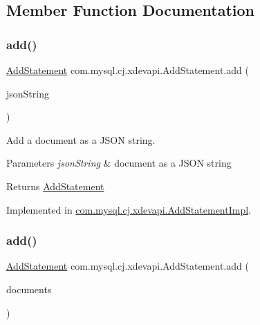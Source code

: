 \subsection{Member Function Documentation}
\mbox{\label{interfacecom_1_1mysql_1_1cj_1_1xdevapi_1_1_add_statement_a74f363f3bc32c51f83c4ae69722b179c}} 
\subsubsection{\texorpdfstring{add()}{add()}\hspace{0.1cm}{\footnotesize\ttfamily [1/2]}}
{\footnotesize\ttfamily \mbox{\hyperlink{interfacecom_1_1mysql_1_1cj_1_1xdevapi_1_1_add_statement}{Add\+Statement}} com.\+mysql.\+cj.\+xdevapi.\+Add\+Statement.\+add (\begin{DoxyParamCaption}\item[{String}]{json\+String }\end{DoxyParamCaption})}

Add a document as a J\+S\+ON string.


\begin{DoxyParams}{Parameters}
{\em json\+String} & document as a J\+S\+ON string \\
\hline
\end{DoxyParams}
\begin{DoxyReturn}{Returns}
\mbox{\hyperlink{interfacecom_1_1mysql_1_1cj_1_1xdevapi_1_1_add_statement}{Add\+Statement}} 
\end{DoxyReturn}


Implemented in \mbox{\hyperlink{classcom_1_1mysql_1_1cj_1_1xdevapi_1_1_add_statement_impl_abba297ed8c7bfb2afad21bebcb3ca13a}{com.\+mysql.\+cj.\+xdevapi.\+Add\+Statement\+Impl}}.

\mbox{\label{interfacecom_1_1mysql_1_1cj_1_1xdevapi_1_1_add_statement_a886e1294099cf00085c882aba48bf06e}} 
\subsubsection{\texorpdfstring{add()}{add()}\hspace{0.1cm}{\footnotesize\ttfamily [2/2]}}
{\footnotesize\ttfamily \mbox{\hyperlink{interfacecom_1_1mysql_1_1cj_1_1xdevapi_1_1_add_statement}{Add\+Statement}} com.\+mysql.\+cj.\+xdevapi.\+Add\+Statement.\+add (\begin{DoxyParamCaption}\item[{Db\+Doc...}]{documents }\end{DoxyParamCaption})}

